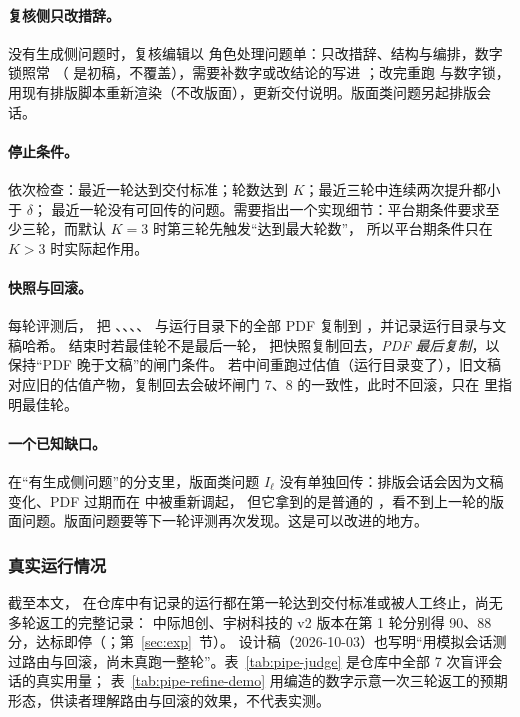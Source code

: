 \paragraph{复核侧只改措辞。}没有生成侧问题时，复核编辑以  角色处理问题单：只改措辞、结构与编排，数字锁照常
（ 是初稿，不覆盖），需要补数字或改结论的写进 ；改完重跑  与数字锁，
用现有排版脚本重新渲染（不改版面），更新交付说明。版面类问题另起排版会话。

\paragraph{停止条件。} 依次检查：最近一轮达到交付标准；轮数达到 $K$；最近三轮中连续两次提升都小于 $\delta$；
最近一轮没有可回传的问题。需要指出一个实现细节：平台期条件要求至少三轮，而默认 $K=3$ 时第三轮先触发“达到最大轮数”，
所以平台期条件只在 $K>3$ 时实际起作用。

\paragraph{快照与回滚。}每轮评测后， 把 、、、、
 与运行目录下的全部 PDF 复制到 ，并记录运行目录与文稿哈希。
结束时若最佳轮不是最后一轮， 把快照复制回去，\emph{PDF 最后复制}，以保持“PDF 晚于文稿”的闸门条件。
若中间重跑过估值（运行目录变了），旧文稿对应旧的估值产物，复制回去会破坏闸门 7、8 的一致性，此时不回滚，只在  里指明最佳轮。

\paragraph{一个已知缺口。}在“有生成侧问题”的分支里，版面类问题 $I_\ell$ 没有单独回传：排版会话会因为文稿变化、PDF 过期而在  中被重新调起，
但它拿到的是普通的 ，看不到上一轮的版面问题。版面问题要等下一轮评测再次发现。这是可以改进的地方。

\subsubsection{真实运行情况}

截至本文， 在仓库中有记录的运行都在第一轮达到交付标准或被人工终止，尚无多轮返工的完整记录：
中际旭创、宇树科技的 v2 版本在第 1 轮分别得 90、88 分，达标即停（；第~\ref{sec:exp}~节）。
设计稿（2026-10-03）也写明“用模拟会话测过路由与回滚，尚未真跑一整轮”。表~\ref{tab:pipe-judge} 是仓库中全部 7 次盲评会话的真实用量；
表~\ref{tab:pipe-refine-demo} 用编造的数字示意一次三轮返工的预期形态，供读者理解路由与回滚的效果，不代表实测。

